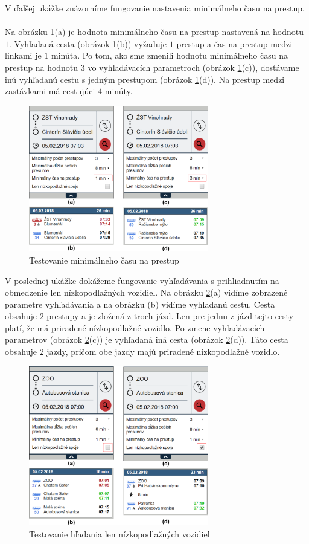 V ďalšej ukážke znázorníme fungovanie nastavenia minimálneho času na prestup. 
\\ \\
Na obrázku \ref{fig:test-min-transfer}(a) je hodnota minimálneho času na prestup nastavená na hodnotu $1$. Vyhľadaná cesta (obrázok \ref{fig:test-min-transfer}(b)) vyžaduje $1$ prestup a čas na prestup medzi linkami je $1$ minúta. Po tom, ako sme zmenili hodnotu minimálneho času na prestup na hodnotu $3$ vo vyhľadávacích parametroch (obrázok \ref{fig:test-min-transfer}(c)), dostávame inú vyhľadanú cestu s jedným prestupom (obrázok \ref{fig:test-min-transfer}(d)). Na prestup medzi zastávkami má cestujúci $4$ minúty.

\begin{figure}[H]
\centerline{\includegraphics[width=0.7\textwidth]{images/test/min-transfer}}
\caption[Testovanie minimálneho času na prestup]{Testovanie minimálneho času na prestup}
\label{fig:test-min-transfer}
\end{figure}

V poslednej ukážke dokážeme fungovanie vyhľadávania s prihliadnutím na obmedzenie len nízkopodlažných vozidiel. Na obrázku \ref{fig:test-low-floor}(a) vidíme zobrazené parametre vyhľadávania a na obrázku (b) vidíme vyhľadanú cestu. Cesta obsahuje $2$ prestupy a je zložená z troch jázd. Len pre jednu z jázd tejto cesty platí, že má priradené nízkopodlažné vozidlo. Po zmene vyhľadávacích parametrov (obrázok \ref{fig:test-low-floor}(c)) je vyhľadaná iná cesta (obrázok \ref{fig:test-low-floor}(d)). Táto cesta obsahuje $2$ jazdy, pričom obe jazdy majú priradené nízkopodlažné vozidlo.

\begin{figure}[H]
\centerline{\includegraphics[width=0.7\textwidth]{images/test/low-floor}}
\caption[Testovanie hľadania len nízkopodlažných vozidiel]{Testovanie hľadania len nízkopodlažných vozidiel}
\label{fig:test-low-floor}
\end{figure}





